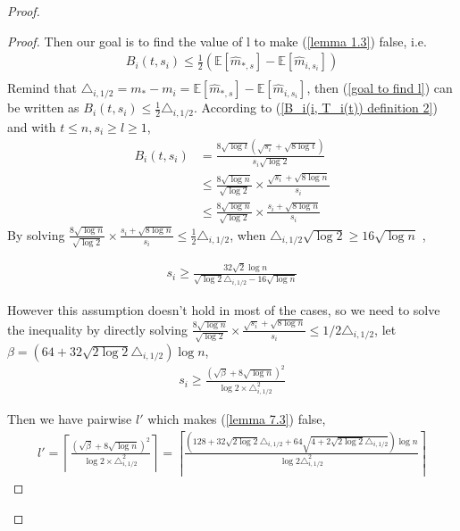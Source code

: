 \documentclass{article}
\theoremstyle{plain}
\begin{document}
\begin{proof}
\begin{proof}
    Then our goal is to find the value of l to make (\ref{lemma 1.3}) false, i.e.
    \begin{align}
    \label{goal to find l}
        B_i(t, s_i) \leq  \frac{1}{2}(\mathbb{E}[\hat{m}_{*, s}] - \mathbb{E}[\hat{m}_{i, s_i}])\\
    \end{align}
    Remind that $\triangle_{i, 1/2} = m_* - m_i = \mathbb{E}[\hat{m}_{*, s}] - \mathbb{E}[\hat{m}_{i, s_i}]$, then (\ref{goal to find l}) can be written as $B_i(t, s_i) \leq  \frac{1}{2} \triangle_{i, 1/2}$. According to (\ref{B_i(i, T_i(t)) definition 2}) and with $t \leq n, s_i \geq l \geq 1$,
    \begin{align}
        B_i(t, s_i) &= \frac{8 \sqrt{\log t} (\sqrt{ s_i} + \sqrt{8\log t})}{s_i  \sqrt{\log 2}}\\
        & \leq \frac{8 \sqrt{\log n}}{\sqrt{\log 2}} \times \frac{\sqrt{s_i} + \sqrt{8\log n}}{s_i}\\
        & \leq \frac{8 \sqrt{\log n}}{\sqrt{\log 2}} \times \frac{s_i + \sqrt{8\log n}}{s_i}
    \end{align}
    By solving $\frac{8 \sqrt{\log n}}{\sqrt{\log 2}} \times \frac{s_i + \sqrt{8\log n}}{s_i} \leq \frac{1}{2} \triangle_{i, 1/2}$, when $\triangle_{i, 1/2} \sqrt{\log 2} \geq 16 \sqrt{\log n}$ ,

    \begin{align}
        s_i \geq \frac{32 \sqrt{2} \log n}{\sqrt{\log 2} \triangle_{i, 1/2} - 16 \sqrt{\log n}}
    \end{align}

    However this assumption doesn't hold in most of the cases, so we need to solve the inequality by directly solving $\frac{8 \sqrt{\log n}}{\sqrt{\log 2}} \times \frac{\sqrt{s_i} + \sqrt{8\log n}}{s_i} \leq 1/2 \triangle_{i, 1/2}$, let $\beta = (64 + 32 \sqrt{2 \log 2} \triangle_{i,1/2} )\log n$,
    \begin{align}
        s_i \geq \frac{(\sqrt{\beta} + 8 \sqrt{\log n})^2}{\log 2 \times \triangle_{i, 1/2}^2}
    \end{align}

    Then we have pairwise $l'$ which makes (\ref{lemma 7.3}) false,
   \begin{align}
       l' = \left\lceil \frac{(\sqrt{\beta} + 8 \sqrt{\log n})^2}{\log 2 \times \triangle_{i, 1/2}^2} \right\rceil = \left\lceil \frac{(128 + 32 \sqrt{2 \log 2} \triangle_{i, 1/2} + 64 \sqrt{4 + 2 \sqrt{2 \log 2} \triangle_{i, 1/2}}) \log n}{\log 2 \triangle_{i, 1/2}^2} \right\rceil
   \end{align}


\end{proof}
\end{proof}
\end{document}
